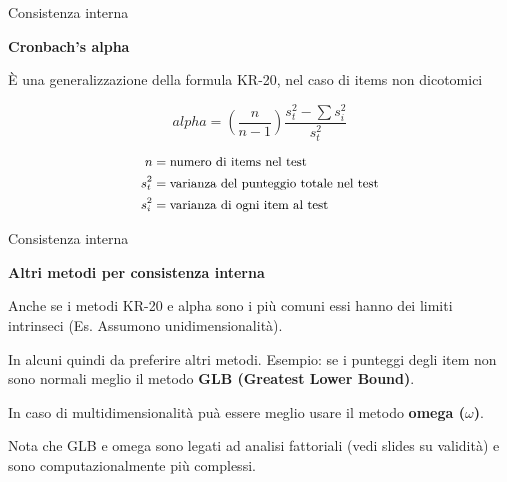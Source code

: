 \documentclass[
  ignorenonframetext,
]{beamer}
\begin{document}
\begin{frame}{Consistenza interna}
\label{consistenza-interna-3}
\begin{center}
  \textbf{Cronbach's alpha}
\end{center}

È una generalizzazione della formula KR-20, nel caso di items non
dicotomici

\[
alpha = (\frac{n}{n-1})\frac{s_t^2 - \sum{s_i^2}}{s_t^2}
\]

\[
\small
\begin{aligned}
n & = \text{numero di items nel test} \\
s_t^2 & = \text{varianza del punteggio totale nel test} \\
s_i^2 & = \text{varianza di ogni item al test} \\
\end{aligned}
\]
\end{frame}

\begin{frame}{Consistenza interna}
\label{consistenza-interna-4}
\begin{center}
  \textbf{Altri metodi per consistenza interna}
\end{center}

Anche se i metodi KR-20 e alpha sono i più comuni essi hanno dei limiti
intrinseci (Es. Assumono unidimensionalità).

In alcuni quindi da preferire altri metodi. Esempio: se i punteggi degli
item non sono normali meglio il metodo \textbf{GLB (Greatest Lower
Bound)}.

In caso di multidimensionalità puà essere meglio usare il metodo
\textbf{omega (\(\omega\))}.

Nota che GLB e omega sono legati ad analisi fattoriali (vedi slides su
validità) e sono computazionalmente più complessi.
\end{frame}
\end{document}
